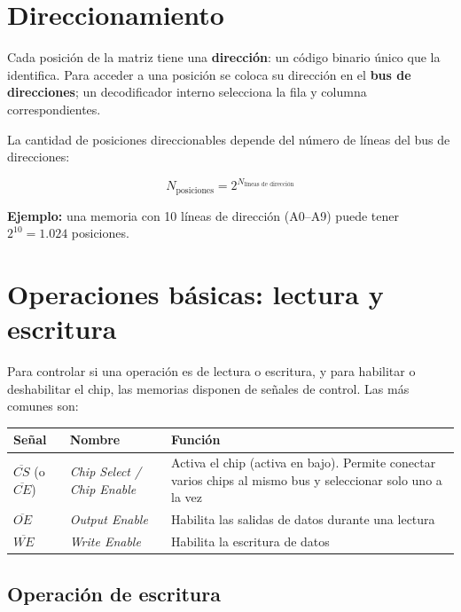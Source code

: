 \section{Direccionamiento}

Cada posición de la matriz tiene una \textbf{dirección}: un código binario único que la identifica. Para acceder a una posición se coloca su dirección en el \textbf{bus de direcciones}; un decodificador interno selecciona la fila y columna correspondientes.


La cantidad de posiciones direccionables depende del número de líneas del bus de direcciones:

$$N_{\text{posiciones}} = 2^{N_{\text{líneas de dirección}}}$$

\textbf{Ejemplo:} una memoria con 10 líneas de dirección (A0--A9) puede tener $2^{10} = 1.024$ posiciones.

\section{Operaciones básicas: lectura y escritura}

Para controlar si una operación es de lectura o escritura, y para habilitar o deshabilitar el chip, las memorias disponen de señales de control. Las más comunes son:

\begin{table}[H]
\centering
\begin{tabular}{llp{7cm}}
\toprule
Señal & Nombre & Función \\
\midrule
$\overline{CS}$ (o $\overline{CE}$) & \textit{Chip Select / Chip Enable} & Activa el chip (activa en bajo). Permite conectar varios chips al mismo bus y seleccionar solo uno a la vez \\
$\overline{OE}$ & \textit{Output Enable} & Habilita las salidas de datos durante una lectura \\
$\overline{WE}$ & \textit{Write Enable} & Habilita la escritura de datos \\
\bottomrule
\end{tabular}
\end{table}

\subsection{Operación de escritura}

